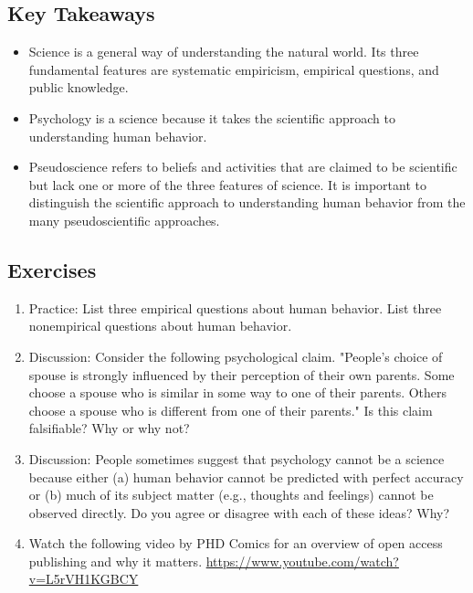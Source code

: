 \subsection{Key Takeaways}
\begin{fullwidth}
\begin{itemize}
\item Science is a general way of understanding the natural world. Its three fundamental features are systematic empiricism, empirical questions, and public knowledge.
\item Psychology is a science because it takes the scientific approach to understanding human behavior.
\item Pseudoscience refers to beliefs and activities that are claimed to be scientific but lack one or more
of the three features of science. It is important to distinguish the scientific approach to understanding human behavior from the many pseudoscientific approaches.
\end{itemize}
\end{fullwidth}

\subsection{Exercises}
\begin{fullwidth}
\begin{enumerate}
\item Practice: List three empirical questions about human behavior. List three nonempirical questions about human behavior.
\item Discussion: Consider the following psychological claim. "People's choice of spouse is strongly influenced by their perception of their own parents. Some choose a spouse who is similar in some way to one of their parents. Others choose a spouse who is different from one of their parents." Is this claim falsifiable? Why or why not?
\item Discussion: People sometimes suggest that psychology cannot be a science because either (a) human behavior cannot be predicted with perfect accuracy or (b) much of its subject matter (e.g., thoughts and feelings) cannot be observed directly. Do you agree or disagree with each of these ideas? Why?
\item Watch the following video by PHD Comics for an overview of open access publishing and why it matters. \url{https://www.youtube.com/watch?v=L5rVH1KGBCY}
\end{enumerate}
\end{fullwidth}

